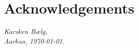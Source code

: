 \chapter*{Acknowledgements}

\todo{\dots}

\vspace{2ex}
\begin{flushright}
  \emph{Karsken Bælg,}\\
  \emph{Aarhus, \today.}
\end{flushright}